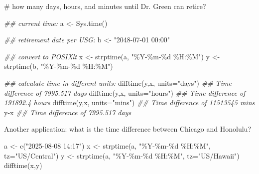\documentclass[
  13,
  letterpaper,
]{report}
\newenvironment{Shaded}{\begin{snugshade}}{\end{snugshade}}
\newcommand{\AttributeTok}[1]{\textcolor[rgb]{0.40,0.45,0.13}{#1}}
\newcommand{\CommentTok}[1]{\textcolor[rgb]{0.37,0.37,0.37}{#1}}
\newcommand{\DocumentationTok}[1]{\textcolor[rgb]{0.37,0.37,0.37}{\textit{#1}}}
\newcommand{\FunctionTok}[1]{\textcolor[rgb]{0.28,0.35,0.67}{#1}}
\newcommand{\NormalTok}[1]{\textcolor[rgb]{0.00,0.23,0.31}{#1}}
\newcommand{\OtherTok}[1]{\textcolor[rgb]{0.00,0.23,0.31}{#1}}
\newcommand{\SpecialCharTok}[1]{\textcolor[rgb]{0.37,0.37,0.37}{#1}}
\newcommand{\StringTok}[1]{\textcolor[rgb]{0.13,0.47,0.30}{#1}}
\begin{document}
\begin{Shaded}
\begin{Highlighting}[]

\CommentTok{\# how many days, hours, and minutes until Dr. Green can retire?}

\DocumentationTok{\#\# current time:}
\NormalTok{a }\OtherTok{\textless{}{-}} \FunctionTok{Sys.time}\NormalTok{()}

\DocumentationTok{\#\# retirement date per USG:}
\NormalTok{b }\OtherTok{\textless{}{-}} \StringTok{"2048{-}07{-}01 00:00"}

\DocumentationTok{\#\# convert to POSIXlt}
\NormalTok{x }\OtherTok{\textless{}{-}} \FunctionTok{strptime}\NormalTok{(a, }\StringTok{"\%Y{-}\%m{-}\%d \%H:\%M"}\NormalTok{)}
\NormalTok{y }\OtherTok{\textless{}{-}} \FunctionTok{strptime}\NormalTok{(b, }\StringTok{"\%Y{-}\%m{-}\%d \%H:\%M"}\NormalTok{)}

\DocumentationTok{\#\# calculate time in different units:}
\FunctionTok{difftime}\NormalTok{(y,x, }\AttributeTok{units=}\StringTok{"days"}\NormalTok{)}
\DocumentationTok{\#\# Time difference of 7995.517 days}
\FunctionTok{difftime}\NormalTok{(y,x, }\AttributeTok{units=}\StringTok{"hours"}\NormalTok{)}
\DocumentationTok{\#\# Time difference of 191892.4 hours}
\FunctionTok{difftime}\NormalTok{(y,x, }\AttributeTok{units=}\StringTok{"mins"}\NormalTok{)}
\DocumentationTok{\#\# Time difference of 11513545 mins}
\NormalTok{y}\SpecialCharTok{{-}}\NormalTok{x}
\DocumentationTok{\#\# Time difference of 7995.517 days}
\end{Highlighting}
\end{Shaded}

Another application: what is the time difference between Chicago and
Honolulu?

\begin{Shaded}
\begin{Highlighting}[]
\NormalTok{a }\OtherTok{\textless{}{-}} \FunctionTok{c}\NormalTok{(}\StringTok{"2025{-}08{-}08 14:17"}\NormalTok{)}
\NormalTok{x }\OtherTok{\textless{}{-}} \FunctionTok{strptime}\NormalTok{(a, }\StringTok{"\%Y{-}\%m{-}\%d \%H:\%M"}\NormalTok{, }\AttributeTok{tz=}\StringTok{"US/Central"}\NormalTok{)}
\NormalTok{y }\OtherTok{\textless{}{-}} \FunctionTok{strptime}\NormalTok{(a, }\StringTok{"\%Y{-}\%m{-}\%d \%H:\%M"}\NormalTok{, }\AttributeTok{tz=}\StringTok{"US/Hawaii"}\NormalTok{)}
\FunctionTok{difftime}\NormalTok{(x,y)}
\end{Highlighting}
\end{Shaded}
\end{document}
